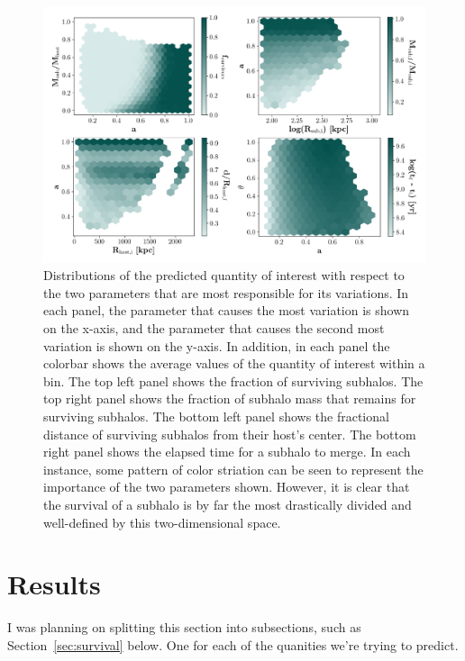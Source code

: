 \documentclass[fleqn,usenatbib]{mnras}
\begin{document}
\begin{figure}
	\includegraphics[width=\textwidth]{Figures/bestSpaces}
    \caption{Distributions of the predicted quantity of interest with respect to the two parameters that are most responsible for its variations. In each panel, the parameter that causes the most variation is shown on the x-axis, and the parameter that causes the second most variation is shown on the y-axis. In addition, in each panel the colorbar shows the average values of the quantity of interest within a bin. The top left panel shows the fraction of surviving subhalos. The top right panel shows the fraction of subhalo mass that remains for surviving subhalos. The bottom left panel shows the fractional distance of surviving subhalos from their host's center. The bottom right panel shows the elapsed time for a subhalo to merge. In each instance, some pattern of color striation can be seen to represent the importance of the two parameters shown. However, it is clear that the survival of a subhalo is by far the most drastically divided and well-defined by this two-dimensional space. }
    \label{fig:bestSpaces}
\end{figure}

\section{Results}
I was planning on splitting this section into subsections, such as Section~\ref{sec:survival} below. One for each of the quanities we're trying to predict.
\end{document}

